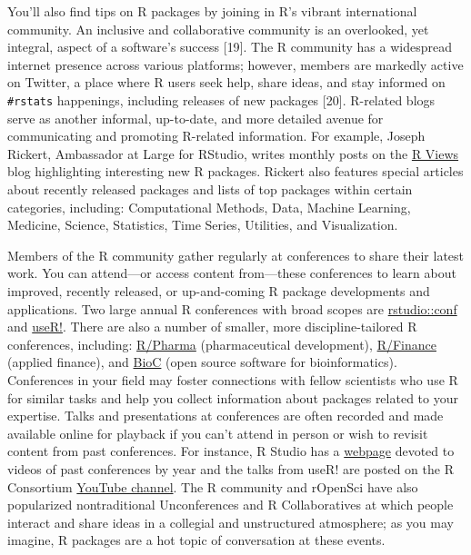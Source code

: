 \documentclass[10pt,letterpaper]{article}
\begin{document}
You'll also find tips on R packages by joining in R's vibrant
international community. An inclusive and collaborative community is an
overlooked, yet integral, aspect of a software's success {[}19{]}. The R
community has a widespread internet presence across various platforms;
however, members are markedly active on Twitter, a place where R users
seek help, share ideas, and stay informed on \texttt{\#rstats}
happenings, including releases of new packages {[}20{]}. R-related blogs
serve as another informal, up-to-date, and more detailed avenue for
communicating and promoting R-related information. For example, Joseph
Rickert, Ambassador at Large for RStudio, writes monthly posts on the
\href{https://rviews.rstudio.com/}{R Views} blog highlighting
interesting new R packages. Rickert also features special articles about
recently released packages and lists of top packages within certain
categories, including: Computational Methods, Data, Machine Learning,
Medicine, Science, Statistics, Time Series, Utilities, and
Visualization.

Members of the R community gather regularly at conferences to share
their latest work. You can attend---or access content from---these
conferences to learn about improved, recently released, or up-and-coming
R package developments and applications. Two large annual R conferences
with broad scopes are
\href{https://rstudio.com/conference/}{rstudio::conf} and
\href{https://www.r-consortium.org/}{useR!}. There are also a number of
smaller, more discipline-tailored R conferences, including:
\href{https://rinpharma.com/}{R/Pharma} (pharmaceutical development),
\href{https://www.rinfinance.com/}{R/Finance} (applied finance), and
\href{https://www.bioconductor.org/help/events/}{BioC} (open source
software for bioinformatics). Conferences in your field may foster
connections with fellow scientists who use R for similar tasks and help
you collect information about packages related to your expertise. Talks
and presentations at conferences are often recorded and made available
online for playback if you can't attend in person or wish to revisit
content from past conferences. For instance, R Studio has a
\href{https://rstudio.com/resources/rstudioconf-2020/}{webpage} devoted
to videos of past conferences by year and the talks from useR! are
posted on the R Consortium
\href{https://www.youtube.com/channel/UC_R5smHVXRYGhZYDJsnXTwg/featured}{YouTube
channel}. The R community and rOpenSci have also popularized
nontraditional Unconferences and R Collaboratives at which people
interact and share ideas in a collegial and unstructured atmosphere; as
you may imagine, R packages are a hot topic of conversation at these
events.
\end{document}
